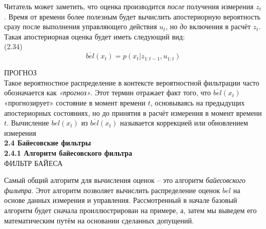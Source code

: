 \documentclass[10pt,a4paper]{article}
\begin{document}
 Читатель может заметить, что оценка производится \textit{после} получения измерения $z_t$. Время от времени более полезным будет вычислить апостериорную вероятность сразу после выполнения управляющего действия $u_t$, но \textit{до} включения в расчёт $z_t$. 
 Такая апостериорная оценка будет иметь следующий вид:\\

 (2.34) $$\overline{bel}(x_t) = p(x_t | z_{1:t-1}, u_{1:t})$$
 
 ПРОГНОЗ\\
 Такое вероятностное распределение в контексте вероятностной фильтрации часто обозначается как \textit{«прогноз»}. Этот термин отражает факт того, что $\overline{bel}(x_t)$ «прогнозирует» состояние в момент времени $t$, основываясь на предыдущих апостериорных состояниях, но до принятия в расчёт измерения в момент времени $t$.  Вычисление $bel(x_t)$ из $\overline{bel}(x_t)$  называется коррекцией или обновлением измерения\\
 
 \textbf{2.4 Байесовские фильтры}\\
 
 \textbf{2.4.1 Алгоритм байесовского фильтра}\\

 ФИЛЬТР БАЙЕСА
 
 Самый общий алгоритм для вычисления оценок – это алгоритм \textit{байесовского фильтра}. Этот алгоритм позволяет вычислить распределение оценок $bel$ на основе данных измерения и управления. Рассмотренный в начале базовый алгоритм будет сначала проиллюстрирован на примере, а, затем мы выведем его математическим путём на основании сделанных допущений.
  
\end{document}
